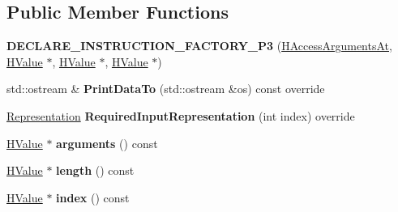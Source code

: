 \subsection*{Public Member Functions}
\begin{DoxyCompactItemize}
\item 
{\bfseries D\+E\+C\+L\+A\+R\+E\+\_\+\+I\+N\+S\+T\+R\+U\+C\+T\+I\+O\+N\+\_\+\+F\+A\+C\+T\+O\+R\+Y\+\_\+\+P3} (\hyperlink{classv8_1_1internal_1_1_h_access_arguments_at}{H\+Access\+Arguments\+At}, \hyperlink{classv8_1_1internal_1_1_h_value}{H\+Value} $\ast$, \hyperlink{classv8_1_1internal_1_1_h_value}{H\+Value} $\ast$, \hyperlink{classv8_1_1internal_1_1_h_value}{H\+Value} $\ast$)\hypertarget{classv8_1_1internal_1_1_h_access_arguments_at_a4ac18b4618ff30ecd937283814d81eb2}{}\label{classv8_1_1internal_1_1_h_access_arguments_at_a4ac18b4618ff30ecd937283814d81eb2}

\item 
std\+::ostream \& {\bfseries Print\+Data\+To} (std\+::ostream \&os) const  override\hypertarget{classv8_1_1internal_1_1_h_access_arguments_at_a0eb49b4a26f72828db8736df2bea5e38}{}\label{classv8_1_1internal_1_1_h_access_arguments_at_a0eb49b4a26f72828db8736df2bea5e38}

\item 
\hyperlink{classv8_1_1internal_1_1_representation}{Representation} {\bfseries Required\+Input\+Representation} (int index) override\hypertarget{classv8_1_1internal_1_1_h_access_arguments_at_a0454dcd19f10ac016485ad83ea639283}{}\label{classv8_1_1internal_1_1_h_access_arguments_at_a0454dcd19f10ac016485ad83ea639283}

\item 
\hyperlink{classv8_1_1internal_1_1_h_value}{H\+Value} $\ast$ {\bfseries arguments} () const \hypertarget{classv8_1_1internal_1_1_h_access_arguments_at_a5fe8d4e7c0a362ad4d93e4f4154fed43}{}\label{classv8_1_1internal_1_1_h_access_arguments_at_a5fe8d4e7c0a362ad4d93e4f4154fed43}

\item 
\hyperlink{classv8_1_1internal_1_1_h_value}{H\+Value} $\ast$ {\bfseries length} () const \hypertarget{classv8_1_1internal_1_1_h_access_arguments_at_a16add22a6f9600f56cc4ae631ae83d7c}{}\label{classv8_1_1internal_1_1_h_access_arguments_at_a16add22a6f9600f56cc4ae631ae83d7c}

\item 
\hyperlink{classv8_1_1internal_1_1_h_value}{H\+Value} $\ast$ {\bfseries index} () const \hypertarget{classv8_1_1internal_1_1_h_access_arguments_at_acee9029a7f48251995a1e8b4dff71c70}{}\label{classv8_1_1internal_1_1_h_access_arguments_at_acee9029a7f48251995a1e8b4dff71c70}

\end{DoxyCompactItemize}
